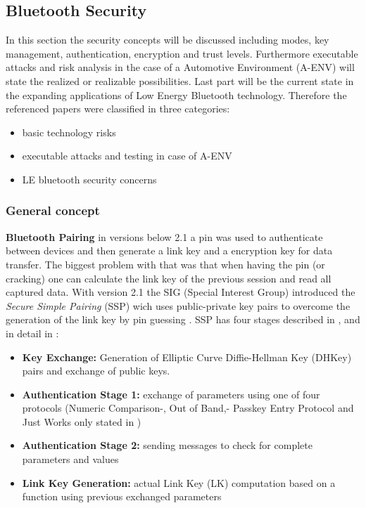 \documentclass[12pt,a4paper]{article}
\begin{document}
\subsection{Bluetooth Security}
In this section the security concepts will be discussed including modes, key management, authentication, encryption and trust levels. Furthermore executable attacks and risk analysis in the case of a Automotive Environment (A-ENV) will state the realized or realizable possibilities. Last part will be the current state in the expanding applications of Low Energy Bluetooth technology. Therefore the referenced papers were classified in three categories: 
\begin{itemize}
	\item basic technology risks
	\item executable attacks and testing in case of A-ENV
	\item LE bluetooth security concerns
\end{itemize}


\subsubsection{General concept}

\textbf{Bluetooth Pairing} in versions below 2.1 a pin was used to authenticate between devices and then generate a link key and a encryption key for data transfer. The biggest problem with that was that when having the pin (or cracking) one can calculate the link key of the previous session and read all captured data. With version 2.1 the SIG (Special Interest Group) introduced the \emph{Secure Simple Pairing} (SSP) wich uses public-private key pairs to overcome the generation of the link key by pin guessing \cite{DBLP:conf/apnoms/FanSL11}. SSP has four stages described in \cite{DBLP:conf/apnoms/FanSL11},  \cite{DBLP:journals/ijnsec/YehPWH12} and in detail in \cite{DBLP:journals/ijnsec/Lackner13} :

\begin{itemize}
	\item \textbf{Key Exchange:} Generation of Elliptic Curve Diffie-Hellman Key (DHKey) pairs and exchange of public keys.
	\item \textbf{Authentication Stage 1:} exchange of parameters using one of four protocols (Numeric Comparison-, Out of Band,- Passkey Entry Protocol and Just Works only stated in  \cite{DBLP:journals/ijnsec/Lackner13})
	\item  \textbf{Authentication Stage 2:} sending messages to check for complete parameters and values
	\item  \textbf{Link Key Generation:} actual Link Key (LK) computation based on a function using previous exchanged parameters
\end{itemize}
\end{document}
